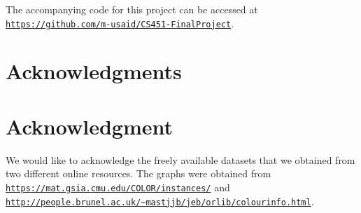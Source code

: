 \documentclass[conference,compsoc]{IEEEtran}
\begin{document}
The accompanying code for this project can be accessed at \texttt{\url{https://github.com/m-usaid/CS451-FinalProject}}. 

\ifCLASSOPTIONcompsoc
\section*{Acknowledgments}
\else
  \section*{Acknowledgment}
\fi

We would like to acknowledge the freely available datasets that we obtained from two different online resources. The graphs 
were obtained from \texttt{\url{https://mat.gsia.cmu.edu/COLOR/instances/}} and 
\texttt{\url{http://people.brunel.ac.uk/~mastjjb/jeb/orlib/colourinfo.html}}.
\end{document}
